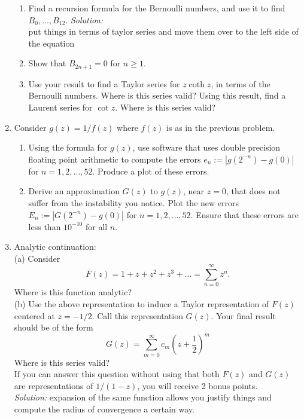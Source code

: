 \documentclass[10pt]{amsart}
\theoremstyle{nonumberplain}
\begin{document}
\begin{enumerate}[label={\bf {\arabic*}:}]
\begin{enumerate}
\item Find a recursion formula for the Bernoulli numbers, and use it to find $B_0, \ldots, B_{12}$.
\textit{Solution:}\\
put things in terms of taylor series and move them over to the left side of the equation
\item Show that $B_{2 n+1}=0$ for $n \geq 1$.
\item Use your result to find a Taylor series for $z \operatorname{coth} z$, in terms of the Bernoulli numbers. Where is this series valid? Using this result, find a Laurent series for $\cot z$. Where is this series valid?    \\
\end{enumerate}
\newpage

\item Consider $g(z) = 1/f(z)$ where $f(z)$ is as in the previous
  problem.
  \begin{enumerate}
  \item Using the formula for $g(z)$, use software that uses double
    precision floating point arithmetic to compute the errors $e_n:=
    |g(2^{-n}) - g(0)|$ for $n= 1,2,\ldots, 52$.  Produce a plot of
    these errors.
  \item Derive an approximation $G(z)$ to $g(z)$, near $z = 0$, that does not suffer
    from the instability you notice.  Plot the new errors $E_n:=
    |G(2^{-n}) - g(0)|$ for $n= 1,2,\ldots, 52$.  Ensure that these
    errors are less than $10^{-10}$ for all $n$.\\
\end{enumerate}
\newpage

\item Analytic continuation: \\
(a) Consider
$$
F(z)=1+z+z^2+z^3+\ldots=\sum_{n=0}^{\infty} z^n .
$$
Where is this function analytic? \\
(b) Use the above representation to induce a Taylor representation of $F(z)$ centered at $z=-1 / 2$. Call this representation $G(z)$. Your final result should be of the form
$$
G(z)=\sum_{m=0}^{\infty} c_m\left(z+\frac{1}{2}\right)^m
$$
Where is this series valid? \\
If you can answer this question without
using that both $F(z)$ and $G(z)$ are representations of $1 /(1-z)$,
you will receive 2 bonus points.\\
\textit{Solution:}
expansion of the same function allows you justify things and compute the radius of convergence a certain way. \\


\end{enumerate}
\end{document}
